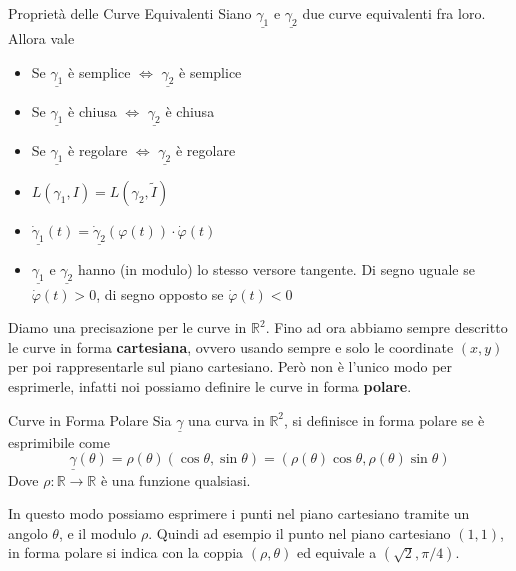\documentclass{rapport}
\begin{document}
\begin{proposizione}{Proprietà delle Curve Equivalenti}{}
Siano $\underline{\gamma_1}$ e $\underline{\gamma_2}$ due curve equivalenti fra loro. Allora vale
\begin{itemize}
  \item Se $\underline{\gamma_1}$ è semplice $\iff$ $\underline{\gamma_2}$ è semplice
  \item Se $\underline{\gamma_1}$ è chiusa $\iff$ $\underline{\gamma_2}$ è chiusa
  \item Se $\underline{\gamma_1}$ è regolare $\iff$ $\underline{\gamma_2}$ è regolare
  \item $L(\gamma_1, I) = L(\gamma_2, \tilde{I})$ 
  \item $\underline{\dot{\gamma}_1}(t) = \underline{\dot{\gamma}_2}(\varphi(t)) \cdot \dot{\varphi}(t) $
  \item $\underline{\gamma_1}$ e $\underline{\gamma_2}$ hanno (in modulo) lo stesso versore tangente. Di segno uguale se $\dot{\varphi}(t) >0$, di segno opposto se $\dot{\varphi}(t) <0$
\end{itemize}
\end{proposizione}

Diamo una precisazione per le curve in $\mathbb{R}^2$. Fino ad ora abbiamo sempre descritto le curve in forma \textbf{cartesiana}, ovvero usando sempre e solo le coordinate $(x, y)$ per poi rappresentarle sul piano cartesiano. Però non è l'unico modo per esprimerle, infatti noi possiamo definire le curve in forma \textbf{polare}.

\begin{definizione}{Curve in Forma Polare}{}
  Sia $\underline{\gamma}$ una curva in $\mathbb{R}^2$, si definisce in forma polare se è esprimibile come 
  \[
  \underline{\gamma}(\theta) = \rho(\theta)(\cos\theta,  \sin\theta )= (\rho(\theta)\cos\theta, \rho(\theta) \sin\theta )
  \]
  Dove $\rho:\mathbb{R}\to\mathbb{R}$ è una funzione qualsiasi.
\end{definizione}
\newpage
In questo modo possiamo esprimere i punti nel piano cartesiano tramite un angolo $\theta$, e il modulo $\rho$. Quindi ad esempio il punto nel piano cartesiano $(1,1)$, in forma polare si indica con la coppia $(\rho, \theta)$ ed equivale a $(\sqrt{2}, \pi/4)$.
\end{document}
